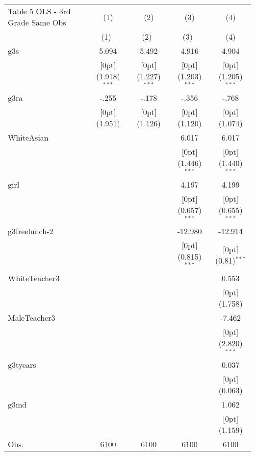 \documentclass[a4paper,11pt]{article}
\begin{document}
\begin{table}
	\small
\begin{tabular*}{\textwidth}{@{\extracolsep{\fill}}lcccc}				
Table 5 OLS - 3rd Grade Same Obs	& \multicolumn{1}{c}{(1)} &	\multicolumn{1}{c}{(2)} &	\multicolumn{1}{c}{(3)} &	\multicolumn{1}{c}{(4)} \\
	\cline{2-5}				
	& \multicolumn{1}{c}{(1)\mbox{\ }} &	\multicolumn{1}{c}{(2)\mbox{\ }} &	\multicolumn{1}{c}{(3)\mbox{\ }} &	\multicolumn{1}{c}{(4)} \\
	\hline				
	g3s &	5.094 &	5.492 &	4.916 &	4.904 \\
	&	\raisebox{.7ex}[0pt]{\scriptsize (1.918)$^{***}$} &	\raisebox{.7ex}[0pt]{\scriptsize (1.227)$^{***}$} &	\raisebox{.7ex}[0pt]{\scriptsize (1.203)$^{***}$} &	\raisebox{.7ex}[0pt]{\scriptsize (1.205)$^{***}$} \\
	g3ra &	-.255 &	-.178 &	-.356 &	-.768 \\
	&	\raisebox{.7ex}[0pt]{\scriptsize (1.951)} &	\raisebox{.7ex}[0pt]{\scriptsize (1.126)} &	\raisebox{.7ex}[0pt]{\scriptsize (1.120)} &	\raisebox{.7ex}[0pt]{\scriptsize (1.074)} \\
	WhiteAsian &	&	&	6.017 &	6.017 \\
	&	&	&	\raisebox{.7ex}[0pt]{\scriptsize (1.446)$^{***}$} &	\raisebox{.7ex}[0pt]{\scriptsize (1.440)$^{***}$} \\
	girl &	&	&	4.197 &	4.199 \\
	&	&	&	\raisebox{.7ex}[0pt]{\scriptsize (0.657)$^{***}$} &	\raisebox{.7ex}[0pt]{\scriptsize (0.655)$^{***}$} \\
	g3freelunch-2 &	&	&	-12.980 &	-12.914 \\
	&	&	&	\raisebox{.7ex}[0pt]{\scriptsize (0.815)$^{***}$} &	\raisebox{.7ex}[0pt]{\scriptsize (0.81)$^{***}$} \\
	WhiteTeacher3 &	&	&	&	0.553 \\
	&	&	&	&	\raisebox{.7ex}[0pt]{\scriptsize (1.758)} \\
	MaleTeacher3 &	&	&	&	-7.462 \\
	&	&	&	&	\raisebox{.7ex}[0pt]{\scriptsize (2.820)$^{***}$} \\
	g3tyears &	&	&	&	0.037 \\
	&	&	&	&	\raisebox{.7ex}[0pt]{\scriptsize (0.063)} \\
	g3md &	&	&	&	1.062 \\
	&	&	&	&	\raisebox{.7ex}[0pt]{\scriptsize (1.159)} \\
	Obs. &	6100 &	6100 &	6100 &	6100 \\
	\hline\hline				
\end{tabular*}	
\end{table}	
\end{document}

